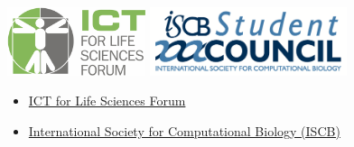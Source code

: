 \documentclass[10pt,]{article}
\begin{document}
 \vspace{2ex}
\begin{minipage}[c]{0.5\columnwidth}
    \centering
    \includegraphics[height=20mm]{./images/ICT-for-Life-Sciences-Forum-logo.png}\quad
    \includegraphics[height=20mm]{./images/ISCBSC-logo.png}
\end{minipage}
\begin{minipage}[c]{0.5\columnwidth}
\begin{itemize}
    \itemsep1pt\parskip0pt
    \item
      \href{http://www.ict4lifesciences.org.au}{ICT for Life Sciences Forum}
    \item
      \href{http://www.iscb.org}{International Society for Computational
      Biology (ISCB)}
    \end{itemize}
\end{minipage}


\vfill
\end{document}
